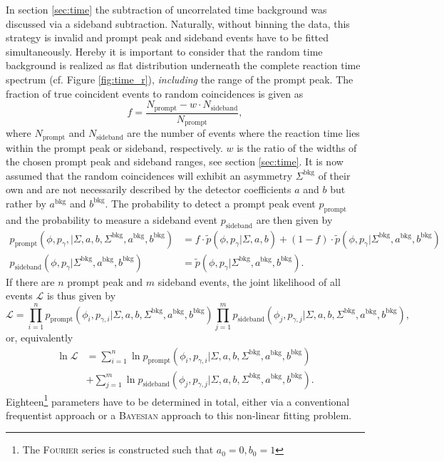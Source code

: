 In section \ref{sec:time} the subtraction of uncorrelated time background was discussed via a sideband subtraction. Naturally, without binning the data, this strategy is invalid and prompt peak and sideband events have to be fitted simultaneously. Hereby it is important to consider that the random time background is realized as flat distribution underneath the complete reaction time spectrum (cf. Figure \ref{fig:time_r}), \emph{including} the range of the prompt peak. The fraction of true coincident events to random coincidences is given as \begin{equation}
	f=\frac{N_\text{prompt}-w\cdot N_\text{sideband}}{N_\text{prompt}},
\end{equation}
where $N_\text{prompt}$ and $N_\text{sideband}$ are the number of events where the reaction time lies within the prompt peak or sideband, respectively. $w$ is the ratio of the widths of the chosen prompt peak and sideband
ranges, see section \ref{sec:time}. It is now assumed that the random coincidences will exhibit an asymmetry $\Sigma^\text{bkg}$ of their own and are not necessarily described by the detector coefficients $a$ and $b$ but rather by $a^\text{bkg}$ and $b^\text{bkg}$. The probability to detect a prompt peak event $p_\text{prompt}$ and the probability to measure a sideband event $p_\text{sideband}$ are then given by 
\begin{align}
p_\text{prompt}\left(\phi,p_\gamma,\big|\Sigma,a,b,\Sigma^\text{bkg},a^\text{bkg},b^\text{bkg}\right)&=f\cdot\tilde{p}\left(\phi,p_\gamma\big|\Sigma,a,b\right)+\left(1-f\right)\cdot\tilde{p}\left(\phi,p_\gamma\big|\Sigma^\text{bkg},a^\text{bkg},b^\text{bkg}\right)\\
p_\text{sideband}\left(\phi,p_\gamma\big|\Sigma^\text{bkg},a^\text{bkg},b^\text{bkg}\right)&=\tilde{p}\left(\phi,p_\gamma\big|\Sigma^\text{bkg},a^\text{bkg},b^\text{bkg}\right).
\end{align}
If there are $n$ prompt peak and $m$ sideband events, the joint likelihood of all events $\mathcal{L}$ is thus given by
\begin{equation}
	\mathcal{L}=\prod_{i=1}^{n}p_\text{prompt}\left(\phi_i,p_{\gamma,i}\big|\Sigma,a,b,\Sigma^\text{bkg},a^\text{bkg},b^\text{bkg}\right)\prod_{j=1}^mp_\text{sideband}\left(\phi_j,p_{\gamma,j}\big|\Sigma,a,b,\Sigma^\text{bkg},a^\text{bkg},b^\text{bkg}\right),
\end{equation}
or, equivalently
\begin{equation}
\begin{aligned}
	\ln\mathcal{L}&=\sum_{i=1}^{n}\ln p_\text{prompt}\left(\phi_i,p_{\gamma,i}\big|\Sigma,a,b,\Sigma^\text{bkg},a^\text{bkg},b^\text{bkg}\right)\\&+\sum_{j=1}^m \ln p_\text{sideband}\left(\phi_j,p_{\gamma,j}\big|\Sigma,a,b,\Sigma^\text{bkg},a^\text{bkg},b^\text{bkg}\right).\label{eq:lik}
\end{aligned}
\end{equation}
Eighteen\footnote{The \textsc{Fourier} series is constructed such that $a_0=0,b_0=1$} parameters have to be determined in total, either via a conventional frequentist approach or a \textsc{Bayesian} approach to this non-linear fitting problem.
